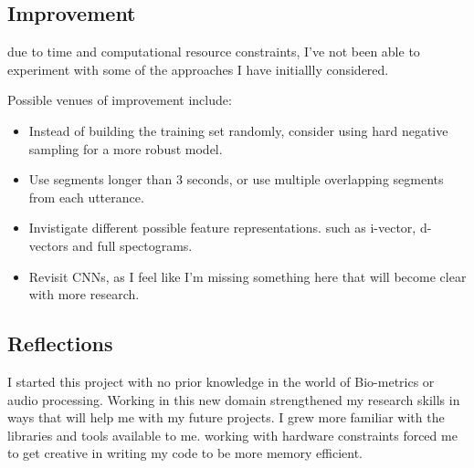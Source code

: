 \documentclass{article}
\begin{document}
\subsection{Improvement}
due to time and computational resource constraints, I've not been able to experiment with some of the approaches I have initiallly considered.

Possible venues of improvement include:
\begin{itemize}
    \item Instead of building the training set randomly, consider using hard negative sampling for a more robust model.
    \item Use segments longer than 3 seconds, or use multiple overlapping segments from each utterance.
    \item Invistigate different possible feature representations. such as i-vector, d-vectors and full spectograms.
    \item Revisit CNNs, as I feel like I'm missing something here that will become clear with more research.
\end{itemize}
\subsection{Reflections}
I started this project with no prior knowledge in the world of Bio-metrics or audio processing. Working in this new domain strengthened my research skills in ways that will help me with my future projects. I grew more familiar with the libraries and tools available to me. working with hardware constraints forced me to get creative in writing my code to be more memory efficient.
\pagebreak


\end{document}

